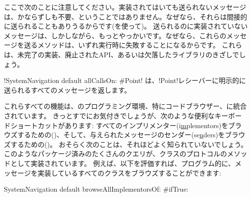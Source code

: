 \documentclass[a4paper,10pt,twoside]{book}
\begin{document}
ここで次のことに注意してください。実装されてはいても送られないメッセージは、かならずしも不要、ということではありません。なぜなら、それらは間接的に送られることもありうるからです(\eg {}を使って)。
送られるのに実装されていないメッセージは、しかしながら、もっとやっかいです。なぜなら、これらのメッセージを送るメソッドは、いずれ実行時に失敗することになるからです。
これらは、未完了の実装、廃止されたAPI、あるいは欠落したライブラリのきざしでしょう。

\ct!SystemNavigation default allCallsOn: #Point! は、\ct!Point!レシーバーに明示的に送られるすべてのメッセージを返します。

これらすべての機能は、\pharo{}のプログラミング環境、特にコードブラウザー、に統合されています。
きっとすでにお気付きでしょうが、次のような便利なキーボードショートカットがあります: すべてのインプリメンター(i\underline{m}plementors)をブラウズするための()、そして、与えられたメッセージのセンダー(se\underline{n}ders)をブラウズするための()。
おそらく次のことは、それほどよく知られていないでしょう。このようなパッケージ済みのたくさんのクエリが、クラスのプロトコルのメソッドとして実装されています。%
例えば、以下を評価すれば、プログラム的に、メッセージを実装しているすべてのクラスをブラウズすることができます:
\begin{code}{}
SystemNavigation default browseAllImplementorsOf: #ifTrue:
\end{code}
\end{document}
